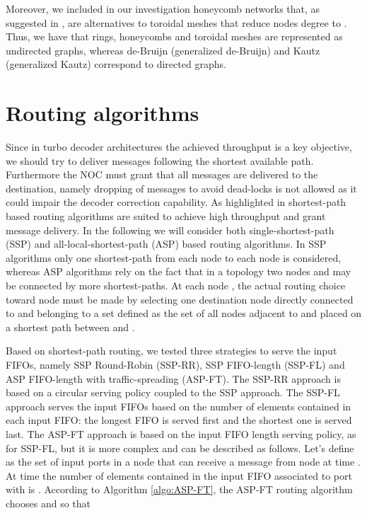 \documentclass[10pt,twocolumn,journal]{IEEEtran}
\begin{document}
Moreover, we included in our investigation honeycomb networks that, 
as suggested in \cite{parhami_TPDS01}, are alternatives to toroidal meshes that reduce nodes degree to .
Thus, we have that rings, honeycombs and toroidal meshes are represented as undirected graphs, whereas de-Bruijn (generalized de-Bruijn) and Kautz (generalized Kautz) correspond to 
directed graphs.

\section{Routing algorithms}
\label{sec:ra}

Since in turbo decoder architectures the achieved throughput is a key objective, we should try to deliver 
messages following the shortest available path. Furthermore the NOC must grant that all messages are delivered to 
the destination, namely dropping of messages to avoid dead-locks is not allowed as it could impair the decoder 
correction capability.
As highlighted in \cite{moussa_iscas08} shortest-path 
based routing algorithms are suited to achieve high throughput and grant message delivery. 
In the following we will consider both single-shortest-path (SSP) and all-local-shortest-path (ASP)
based routing algorithms.
In SSP algorithms only one shortest-path from each node  to each node  is considered, whereas ASP algorithms 
rely on the fact that in a topology two nodes  and  may be connected by more shortest-paths. 
At each node , the actual routing choice toward node  must be made by selecting one destination node 
directly connected to  and belonging to a set  defined as the set of all nodes adjacent to 
 and placed on a shortest path between  and .

Based on shortest-path routing, we tested three strategies to serve the input FIFOs, namely SSP Round-Robin (SSP-RR), 
SSP FIFO-length (SSP-FL) and ASP FIFO-length with traffic-spreading (ASP-FT). 
The SSP-RR approach is based on a circular serving policy coupled to the SSP approach.
The SSP-FL approach serves the input FIFOs based on the number of elements contained in each input FIFO: the longest FIFO is served first and the shortest one is served last. 
The ASP-FT approach is based on the input FIFO length serving policy, as for SSP-FL, but it is more complex and 
can be described as follows. Let's define 
 as the set of input ports in a node  
that can receive a message from node  at time . At time  the number of elements contained in the 
input FIFO associated to port  with  is .
According to Algorithm \ref{algo:ASP-FT}, the ASP-FT routing algorithm chooses 
 and  
so that 
\end{document}
